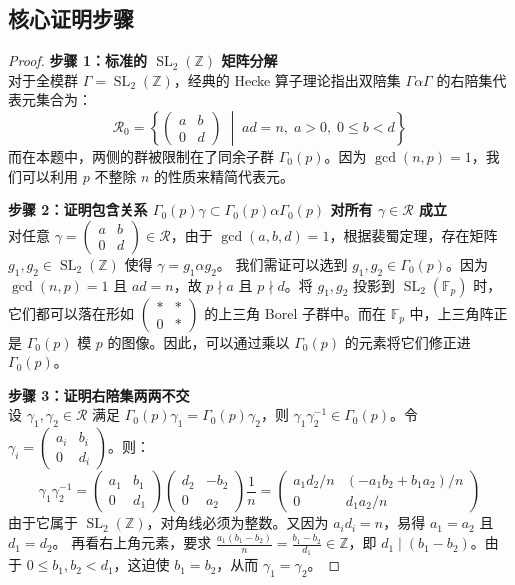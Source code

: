 \documentclass[]{article}
\begin{document}
	\subsection*{核心证明步骤}
	\begin{proof}
		\textbf{步骤 1：标准的 $\operatorname{SL}_2(\mathbb{Z})$ 矩阵分解} \\
		对于全模群 $\Gamma = \operatorname{SL}_2(\mathbb{Z})$，经典的 Hecke 算子理论指出双陪集 $\Gamma \alpha \Gamma$ 的右陪集代表元集合为：
		\[ \mathcal{R}_0 = \left\{ \begin{pmatrix} a & b \\ 0 & d \end{pmatrix} \;\middle|\; ad=n, \; a>0, \; 0 \le b < d \right\} \]
		而在本题中，两侧的群被限制在了同余子群 $\Gamma_0(p)$。因为 $\gcd(n,p)=1$，我们可以利用 $p$ 不整除 $n$ 的性质来精简代表元。
		
		\textbf{步骤 2：证明包含关系 $\Gamma_0(p)\gamma \subset \Gamma_0(p)\alpha\Gamma_0(p)$ 对所有 $\gamma \in \mathcal{R}$ 成立} \\
		对任意 $\gamma = \begin{pmatrix} a & b \\ 0 & d \end{pmatrix} \in \mathcal{R}$，由于 $\gcd(a,b,d)=1$，根据裴蜀定理，存在矩阵 $g_1, g_2 \in \operatorname{SL}_2(\mathbb{Z})$ 使得 $\gamma = g_1 \alpha g_2$。
		我们需证可以选到 $g_1, g_2 \in \Gamma_0(p)$。因为 $\gcd(n,p)=1$ 且 $ad=n$，故 $p \nmid a$ 且 $p \nmid d$。将 $g_1, g_2$ 投影到 $\operatorname{SL}_2(\mathbb{F}_p)$ 时，它们都可以落在形如 $\begin{pmatrix} * & * \\ 0 & * \end{pmatrix}$ 的上三角 Borel 子群中。而在 $\mathbb{F}_p$ 中，上三角阵正是 $\Gamma_0(p)$ 模 $p$ 的图像。因此，可以通过乘以 $\Gamma_0(p)$ 的元素将它们修正进 $\Gamma_0(p)$。
		
		\textbf{步骤 3：证明右陪集两两不交} \\
		设 $\gamma_1, \gamma_2 \in \mathcal{R}$ 满足 $\Gamma_0(p)\gamma_1 = \Gamma_0(p)\gamma_2$，则 $\gamma_1 \gamma_2^{-1} \in \Gamma_0(p)$。令 $\gamma_i = \begin{pmatrix} a_i & b_i \\ 0 & d_i \end{pmatrix}$。则：
		\[ \gamma_1 \gamma_2^{-1} = \begin{pmatrix} a_1 & b_1 \\ 0 & d_1 \end{pmatrix} \begin{pmatrix} d_2 & -b_2 \\ 0 & a_2 \end{pmatrix} \frac{1}{n} = \begin{pmatrix} a_1 d_2 / n & (-a_1 b_2 + b_1 a_2)/n \\ 0 & d_1 a_2 / n \end{pmatrix} \]
		由于它属于 $\operatorname{SL}_2(\mathbb{Z})$，对角线必须为整数。又因为 $a_i d_i = n$，易得 $a_1 = a_2$ 且 $d_1 = d_2$。
		再看右上角元素，要求 $\frac{a_1(b_1 - b_2)}{n} = \frac{b_1 - b_2}{d_1} \in \mathbb{Z}$，即 $d_1 \mid (b_1 - b_2)$。由于 $0 \le b_1, b_2 < d_1$，这迫使 $b_1 = b_2$，从而 $\gamma_1 = \gamma_2$。
		

\end{proof}
\end{document}
